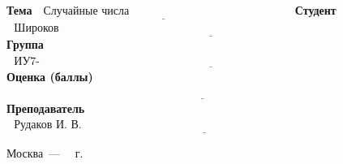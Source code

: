 \begin{titlepage}
	\noindent\textbf{Тема}           $\underline{\text{~~Случайные числа~~~~~~~~~~~~~~~~~~~~~~~~~~~~~~~~~~~~~~~~~~~}}$\newline\newline
	\noindent\textbf{Студент}        $\underline{\text{~~Широков А.А.~~~~~~~~~~~~~~~~~~~~~~~~~~~~~~~~~~~~~~~~~~~~~~~~~~~~~~~~~~~~~~~~~~~~~~~~~~~~~~~~~~~~~~~~~~~~~~~}}$\newline\newline
	\noindent\textbf{Группа}         $\underline{\text{~~ИУ7-64Б~~~~~~~~~~~~~~~~~~~~~~~~~~~~~~~~~~~~~~~~~~~~~~~~~~~~~~~~~~~~~~~~~~~~~~~~~~~~~~~~~~~~~~~~~~~~~~~~~~~~~~}}$\newline\newline
	\noindent\textbf{Оценка (баллы)} $\underline{\text{~~~~~~~~~~~~~~~~~~~~~~~~~~~~~~~~~~~~~~~~~~~~~~~~~~~~~~~~~~~~~~~~~~~~~~~~~~~~~~~~~~~~~~~~~~~~~~~~~~~~~~~~}}$\newline\newline
	\noindent\textbf{Преподаватель}  $\underline{\text{~~Рудаков И. В.~~~~~~~~~~~~~~~~~~~~~~~~~~~~~~~~~~~~~~~~~~~~~~~~~~~~~~~~~~~~~~~~~~~~~~~~~~~~~~~~~~~~~}}$\newline	
	\begin{center}
		\vfill
		Москва~---~\the\year
		~г.
	\end{center}
	\restoregeometry
\end{titlepage}

